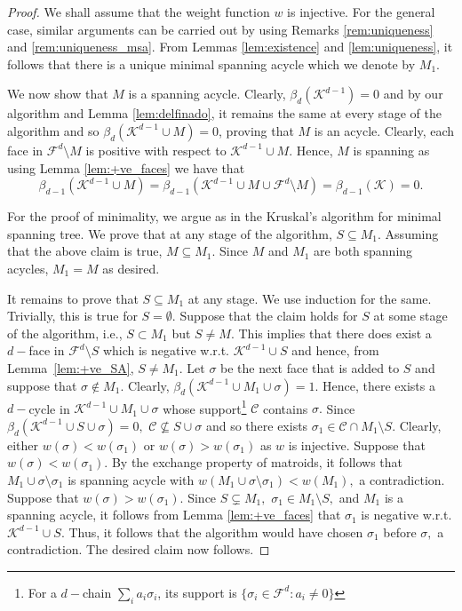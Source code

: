 \documentclass[12pt]{amsart}
\numberwithin{equation}{section}
\numberwithin{theorem}{section}
\newcommand{\1}{\mathbf{1}}
\def\sC{\mathscr{C}}
\def\F{\mathcal{F}}
\def\K{\mathcal{K}}
\begin{document}
\begin{proof}
We shall assume that the weight function $w$ is injective. For the general case, similar arguments can be carried out by using Remarks  \ref{rem:uniqueness} and \ref{rem:uniqueness_msa}. From Lemmas \ref{lem:existence} and \ref{lem:uniqueness}, it follows that there is a unique minimal spanning acycle which we denote by $M_1.$

We now show that $M$ is a spanning acycle. Clearly, $\beta_{d}(\K^{d-1}) = 0$ and by our algorithm and Lemma \ref{lem:delfinado}, it remains the same at every stage of the algorithm and so $\beta_{d}(\K^{d-1} \cup M) = 0$, proving that $M$ is an acycle. Clearly, each face in $\F^d \setminus M$ is positive with respect to $\K^{d-1} \cup M$. Hence, $M$ is spanning as using Lemma \ref{lem:+ve_faces} we have that
%
$$\beta_{d-1}(\K^{d-1} \cup M) = \beta_{d-1}(\K^{d-1} \cup M \cup \F^d \setminus M) = \beta_{d-1}(\K) = 0.$$
%

For the proof of minimality, we argue as in the Kruskal's algorithm for minimal spanning tree. We prove that at any stage of the algorithm, $S \subseteq M_1.$ Assuming that the above claim is true, $M \subseteq M_1$. Since $M$ and $M_1$ are both spanning acycles, $M_1 =  M$ as desired.

It remains to prove that $S \subseteq M_1$ at any stage. We use induction for the same. Trivially, this is true for $S = \emptyset$. Suppose that the claim holds for $S$ at some stage of the algorithm, i.e., $S \subset M_1$ but $S \neq M.$ This implies that there does exist a  $d-$face in $\F^d \setminus S$ which is negative w.r.t. $\K^{d - 1} \cup S$ and hence, from Lemma~\ref{lem:+ve_SA}, $S \neq M_1.$ Let $\sigma$ be the next face that is added to $S$ and suppose that $\sigma \notin M_1.$ Clearly, $\beta_d(\K^{d - 1} \cup M_1 \cup \sigma) = 1.$ Hence, there exists a $d-$cycle in $\K^{d - 1} \cup M_1 \cup \sigma$ whose support\footnote{For a $d-$chain $\sum_i a_i \sigma_i$, its support is $\{\sigma_i \in \F^d : a_i \neq 0\}$} $\sC$  contains $\sigma.$ Since $\beta_d(\K^{d - 1} \cup S \cup \sigma) = 0,$ $\sC \not\subseteq S \cup \sigma$ and so there exists $\sigma_1 \in \sC \cap M_1 \setminus S.$ Clearly, either $w(\sigma) < w(\sigma_1)$ or $w(\sigma) > w(\sigma_1)$ as $w$ is injective. Suppose that $w(\sigma) < w(\sigma_1).$ By the exchange property of matroids, it follows that $M_1 \cup \sigma \setminus \sigma_1$ is spanning acycle with $w(M_1 \cup \sigma \setminus \sigma_1) < w(M_1),$ a contradiction. Suppose that $w(\sigma) > w(\sigma_1).$ Since $S \subsetneq M_1,$ $\sigma_1 \in M_1 \setminus S,$ and $M_1$ is a spanning acycle, it follows from Lemma \ref{lem:+ve_faces} that $\sigma_1$ is negative w.r.t. $\K^{d - 1} \cup S.$ Thus, it follows that the algorithm would have chosen $\sigma_1$ before $\sigma,$ a contradiction. The desired claim now follows. 
\end{proof}
\end{document}
